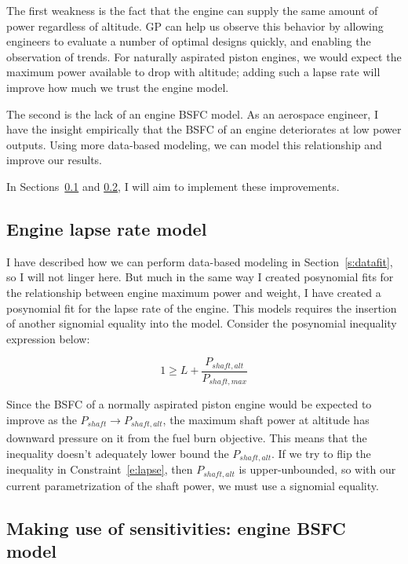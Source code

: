 The first weakness is the fact that the engine can supply the same amount of power
regardless of altitude. \gls{GP} can help us observe this behavior by allowing engineers to
evaluate a number of optimal designs quickly, and enabling the observation of trends.
For naturally aspirated piston engines, we would expect the maximum power available to
drop with altitude; adding such a lapse rate will improve how much we trust the engine model.

The second is the lack of an engine BSFC model. As an aerospace engineer, I have the insight
empirically that the BSFC of an engine deteriorates at low power outputs.  Using more
data-based modeling, we can model this relationship and improve our results.

In Sections~\ref{s:lapse} and \ref{s:BSFC}, I will aim to implement these improvements.

\subsection{Engine lapse rate model}
\label{s:lapse}

I have described how we can perform data-based modeling in Section~\ref{s:datafit}, so I will
not linger here. But much in the same way I created posynomial fits for the relationship between
engine maximum power and weight, I have created a posynomial fit for the lapse rate of the engine.
This models requires the insertion of another signomial equality into the model. Consider the
posynomial inequality expression below:

\begin{equation}
    \label{e:lapse}
    1 \geq L + \frac{P_{shaft,alt}}{P_{shaft,max}}
\end{equation}

Since the BSFC of a normally aspirated piston engine would be expected to improve
as the $P_{shaft} \xrightarrow[]{} P_{shaft,alt}$, the maximum shaft
power at altitude has downward pressure on it from the fuel burn objective. This means that the
inequality doesn't adequately lower bound the $P_{shaft,alt}$. If we try to flip the inequality in
Constraint~\ref{e:lapse}, then $P_{shaft,alt}$ is upper-unbounded, so with our current parametrization
of the shaft power, we must use a signomial equality.

\subsection{Making use of sensitivities: engine BSFC model}
\label{s:BSFC}


